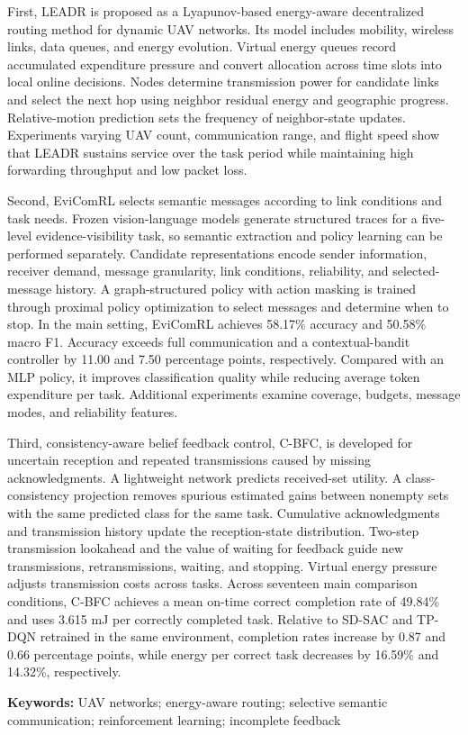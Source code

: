 First, LEADR is proposed as a Lyapunov-based energy-aware decentralized routing method for dynamic UAV networks. Its model includes mobility, wireless links, data queues, and energy evolution. Virtual energy queues record accumulated expenditure pressure and convert allocation across time slots into local online decisions. Nodes determine transmission power for candidate links and select the next hop using neighbor residual energy and geographic progress. Relative-motion prediction sets the frequency of neighbor-state updates. Experiments varying UAV count, communication range, and flight speed show that LEADR sustains service over the task period while maintaining high forwarding throughput and low packet loss.

Second, EviComRL selects semantic messages according to link conditions and task needs. Frozen vision-language models generate structured traces for a five-level evidence-visibility task, so semantic extraction and policy learning can be performed separately. Candidate representations encode sender information, receiver demand, message granularity, link conditions, reliability, and selected-message history. A graph-structured policy with action masking is trained through proximal policy optimization to select messages and determine when to stop. In the main setting, EviComRL achieves 58.17\% accuracy and 50.58\% macro F1. Accuracy exceeds full communication and a contextual-bandit controller by 11.00 and 7.50 percentage points, respectively. Compared with an MLP policy, it improves classification quality while reducing average token expenditure per task. Additional experiments examine coverage, budgets, message modes, and reliability features.

Third, consistency-aware belief feedback control, C-BFC, is developed for uncertain reception and repeated transmissions caused by missing acknowledgments. A lightweight network predicts received-set utility. A class-consistency projection removes spurious estimated gains between nonempty sets with the same predicted class for the same task. Cumulative acknowledgments and transmission history update the reception-state distribution. Two-step transmission lookahead and the value of waiting for feedback guide new transmissions, retransmissions, waiting, and stopping. Virtual energy pressure adjusts transmission costs across tasks. Across seventeen main comparison conditions, C-BFC achieves a mean on-time correct completion rate of 49.84\% and uses 3.615 mJ per correctly completed task. Relative to SD-SAC and TP-DQN retrained in the same environment, completion rates increase by 0.87 and 0.66 percentage points, while energy per correct task decreases by 16.59\% and 14.32\%, respectively.

\vspace{1em}
\noindent\textbf{Keywords:} UAV networks; energy-aware routing; selective semantic communication; reinforcement learning; incomplete feedback
